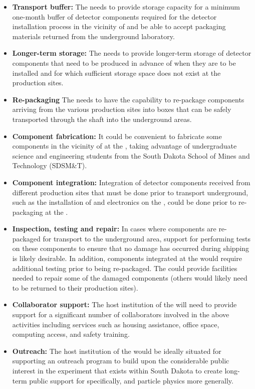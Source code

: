 \begin{itemize}
  \item {\bf Transport buffer:} The  needs to provide
    storage capacity for a minimum one-month buffer of detector
    components required for the detector installation process in the
    vicinity of \surf and be able to accept packaging materials
    returned from the underground laboratory.
  \item {\bf Longer-term storage:} The  needs to provide
    longer-term storage of detector components that need to be
    produced in advance of when they are to be installed and for which
    sufficient storage space does not exist at the production sites.
  \item {\bf Re-packaging} The  needs to have the capability
    to re-package components arriving from the various production
    sites into boxes that can be safely transported through the shaft
    into the underground areas.
  \item {\bf Component fabrication:} It could be convenient to fabricate some
  components %
  in the vicinity
    of \surf at the , taking advantage of
    undergraduate science and engineering students from the South
    Dakota School of Mines and Technology (SDSM\&T).
  \item {\bf Component integration:} Integration of detector components
  received from different production sites %
  that must be done prior to transport underground,
    such as the installation of  and 
    electronics on the , could be done
    prior to re-packaging at the .    
  \item {\bf Inspection, testing and repair:} In cases where
    components are re-packaged for transport to the underground area,
     support for performing tests on these components to
    ensure that no damage has occurred during shipping is likely
    desirable.  In addition, components integrated at the 
    would require additional testing prior to being re-packaged.  The
     could provide facilities needed to repair some of the
    damaged components (others would likely need to be returned to
    their production sites).
  \item {\bf Collaborator support:} The host institution of the 
    will need to %
    provide support for a significant number
    of  collaborators involved in the above activities
    including services such as housing assistance, office space,
    computing access, and safety training.
  \item {\bf Outreach:} The host institution of the  would be
    ideally situated for supporting an outreach program to build upon
    the considerable public interest in the experiment that exists
    within South Dakota to create long-term public support for
     specifically, and particle physics more generally.
\end{itemize}

